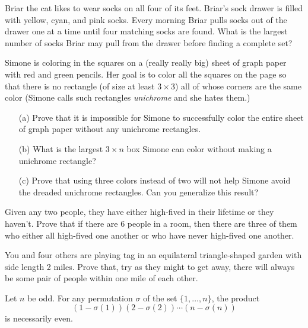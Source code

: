\documentclass{article}
\begin{document}
\begin{exercise}
    Briar the cat likes to wear socks on all four of its feet. 
    Briar's sock drawer is filled with yellow, cyan, and pink socks. 
    Every morning Briar pulls socks out of the drawer one at a time until four matching socks are found. 
    What is the largest number of socks Briar may pull from the drawer before finding a complete set?
\end{exercise}

\begin{exercise}
    Simone is coloring in the squares on a (really really big) sheet of graph paper with red and green pencils. 
    Her goal is to color all the squares on the page so that there is no rectangle (of size at least \(3\times 3\)) all of whose corners are the same color (Simone calls such rectangles \textit{unichrome} and she hates them.) 
    \begin{enumerate}
        \item[(a)] Prove that it is impossible for Simone to successfully color the entire sheet of graph paper without any unichrome rectangles.
        \item[(b)] What is the largest \(3\times n\) box Simone can color without making a unichrome rectangle?
        \item[(c)] Prove that using three colors instead of two will not help Simone avoid the dreaded unichrome rectangles.
        Can you generalize this result?
    \end{enumerate}
\end{exercise}

\begin{exercise}
    Given any two people, they have either high-fived in their lifetime or they haven't.
    Prove that if there are 6 people in a room, then there are three of them who either all high-fived one another or who have never high-fived one another.
\end{exercise}

\begin{exercise}
    You and four others are playing tag in an equilateral triangle-shaped garden with side length 2 miles.
    Prove that, try as they might to get away, there will always be some pair of people within one mile of each other.
\end{exercise}

\begin{exercise}
    Let \(n\) be odd.
    For any permutation \(\sigma\) of the set \(\{1,\ldots,n\}\), the product
    \[(1-\sigma(1))(2-\sigma(2))\cdots(n-\sigma(n))\]
    is necessarily even.
\end{exercise}
\end{document}
